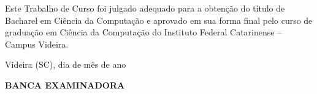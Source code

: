 \begin{folhadeaprovacao}

  \begin{center}
  \vspace*{-1.2cm}
    \textbf{\large\imprimirautor}
    
    \vspace*{\fill}\vspace*{\fill}\vspace*{\fill}
    \parbox{15cm}{
        \OnehalfSpacing\centering\large\textbf{\imprimirtitulo}
    }
    \vspace*{\fill}\vspace*{\fill}
    
    \hspace{.45\textwidth}
    \begin{minipage}{.5\textwidth}
        Este Trabalho de Curso foi julgado
        adequado para a obtenção do título de
        Bacharel em Ciência da Computação e
        aprovado em sua forma final pelo curso de
        graduação em Ciência da Computação do Instituto Federal Catarinense
        – Campus Videira. 

    \end{minipage}%
    \vspace*{\fill}
   \end{center}
    \vspace{-1cm}
  \begin{center}
  	 Videira (SC), dia de mês de ano
  \end{center}
  


  
   			  
    \begin{center}
  	\textbf{ BANCA EXAMINADORA}
   \end{center}
    

    \vspace*{1cm}
  
\end{folhadeaprovacao}